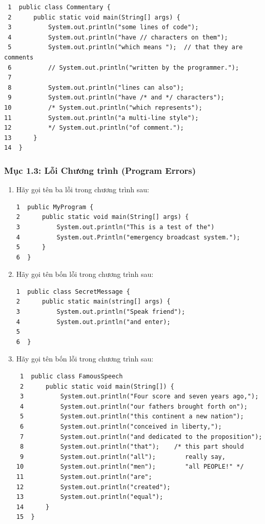 \begin{enumerate}
\begin{verbatim}
 1  public class Commentary {
 2      public static void main(String[] args) {
 3          System.out.println("some lines of code");
 4          System.out.println("have // characters on them");
 5          System.out.println("which means ");  // that they are comments
 6          // System.out.println("written by the programmer.");
 7
 8          System.out.println("lines can also");
 9          System.out.println("have /* and */ characters");
10          /* System.out.println("which represents");
11          System.out.println("a multi-line style");
12          */ System.out.println("of comment.");
13      }
14  }
\end{verbatim}
\end{enumerate}

\subsubsection{Mục 1.3: Lỗi Chương trình (Program
Errors)}\label{mux1ee5c-1.3-lux1ed7i-chux1b0ux1a1ng-truxecnh-program-errors}

\begin{enumerate}
\def\labelenumi{\arabic{enumi}.}
\setcounter{enumi}{17}
\item
  Hãy gọi tên ba lỗi trong chương trình sau:

\begin{verbatim}
1  public MyProgram {
2      public static void main(String[] args) {
3          System.out.println("This is a test of the")
4          System.out.Println("emergency broadcast system.");
5      }
6  }
\end{verbatim}
\item
  Hãy gọi tên bốn lỗi trong chương trình sau:

\begin{verbatim}
1  public class SecretMessage {
2      public static main(string[] args) {
3          System.out.println("Speak friend");
4          System.out.println("and enter);
5
6  }
\end{verbatim}
\item
  Hãy gọi tên bốn lỗi trong chương trình sau:

\begin{verbatim}
 1  public class FamousSpeech
 2      public static void main(String[]) {
 3          System.out.println("Four score and seven years ago,");
 4          System.out.println("our fathers brought forth on");
 5          System.out.println("this continent a new nation");
 6          System.out.println("conceived in liberty,");
 7          System.out.println("and dedicated to the proposition");
 8          System.out.println("that");    /* this part should
 9          System.out.println("all");        really say,
10          System.out.println("men");        "all PEOPLE!" */
11          System.out.println("are";
12          System.out.println("created");
13          System.out.println("equal");
14      }
15  }
\end{verbatim}
\end{enumerate}

